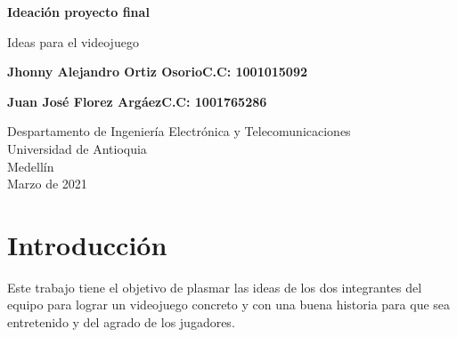 \documentclass{article}
\begin{document}
\begin{titlepage}
    \begin{center}
        \vspace*{1cm}
            
        \Huge
        \textbf{Ideación proyecto final }
            
        \vspace{0.5cm}
        \LARGE
        Ideas para el videojuego
            
        \vspace{1.5cm}
            
        \textbf{Jhonny Alejandro Ortiz Osorio\newline C.C: 1001015092}
        
        \textbf{Juan José Florez Argáez\newline C.C: 1001765286}  
        \vfill
            
        \vspace{0.8cm}
            
        \Large
        Despartamento de Ingeniería Electrónica y Telecomunicaciones\\
        Universidad de Antioquia\\
        Medellín\\
        Marzo de 2021
            
    \end{center}
\end{titlepage}

\tableofcontents
\newpage
\section{Introducción}\label{intro}
Este trabajo tiene el objetivo de plasmar las ideas de los dos integrantes del equipo para lograr un videojuego concreto y con una buena historia para que sea entretenido y del agrado de los jugadores.
\end{document}
